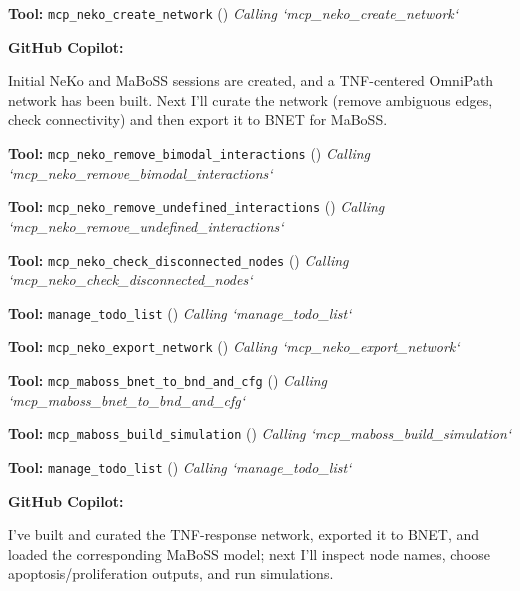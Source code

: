\documentclass[11pt,a4paper]{article}
\begin{document}
\begin{toolokbox}
\textbf{Tool:} \texttt{mcp\_neko\_create\_network} (\checkmark)
\textit{Calling `mcp\_neko\_create\_network`}
\end{toolokbox}
\begin{copilotbox}
\textbf{GitHub Copilot:}

Initial NeKo and MaBoSS sessions are created, and a TNF-centered OmniPath network has been built. Next I’ll curate the network (remove ambiguous edges, check connectivity) and then export it to BNET for MaBoSS.

\end{copilotbox}
\begin{toolokbox}
\textbf{Tool:} \texttt{mcp\_neko\_remove\_bimodal\_interactions} (\checkmark)
\textit{Calling `mcp\_neko\_remove\_bimodal\_interactions`}
\end{toolokbox}
\begin{toolokbox}
\textbf{Tool:} \texttt{mcp\_neko\_remove\_undefined\_interactions} (\checkmark)
\textit{Calling `mcp\_neko\_remove\_undefined\_interactions`}
\end{toolokbox}
\begin{toolokbox}
\textbf{Tool:} \texttt{mcp\_neko\_check\_disconnected\_nodes} (\checkmark)
\textit{Calling `mcp\_neko\_check\_disconnected\_nodes`}
\end{toolokbox}
\begin{toolokbox}
\textbf{Tool:} \texttt{manage\_todo\_list} (\checkmark)
\textit{Calling `manage\_todo\_list`}
\end{toolokbox}
\begin{toolokbox}
\textbf{Tool:} \texttt{mcp\_neko\_export\_network} (\checkmark)
\textit{Calling `mcp\_neko\_export\_network`}
\end{toolokbox}
\begin{toolokbox}
\textbf{Tool:} \texttt{mcp\_maboss\_bnet\_to\_bnd\_and\_cfg} (\checkmark)
\textit{Calling `mcp\_maboss\_bnet\_to\_bnd\_and\_cfg`}
\end{toolokbox}
\begin{toolokbox}
\textbf{Tool:} \texttt{mcp\_maboss\_build\_simulation} (\checkmark)
\textit{Calling `mcp\_maboss\_build\_simulation`}
\end{toolokbox}
\begin{toolokbox}
\textbf{Tool:} \texttt{manage\_todo\_list} (\checkmark)
\textit{Calling `manage\_todo\_list`}
\end{toolokbox}
\begin{copilotbox}
\textbf{GitHub Copilot:}

I’ve built and curated the TNF-response network, exported it to BNET, and loaded the corresponding MaBoSS model; next I’ll inspect node names, choose apoptosis/proliferation outputs, and run simulations.

\end{copilotbox}
\end{document}
